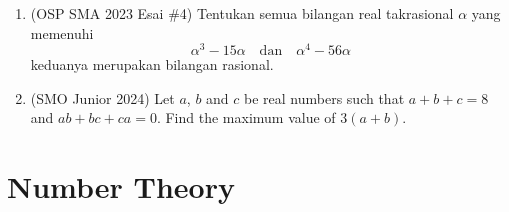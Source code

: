\documentclass[11pt,letterpaper]{article}
\begin{document}
\begin{enumerate}
    \item (OSP SMA 2023 Esai \#4) Tentukan semua bilangan real takrasional $\alpha$ yang memenuhi
    \[ \alpha^3-15\alpha \quad \text{dan} \quad \alpha^4-56\alpha \]
    keduanya merupakan bilangan rasional.

    \item (SMO Junior 2024) Let $a$, $b$ and $c$ be real numbers such that $a+b+c=8$ and $ab+bc+ca=0$. Find the maximum value of $3(a+b)$.
\end{enumerate}

\section*{Number Theory}
\end{document}
